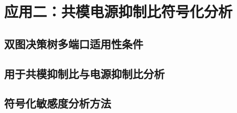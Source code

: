 \chapter{应用二：共模电源抑制比符号化分析}
\label{chap:cmps}

\section{双图决策树多端口适用性条件}
\label{sec:cmps:gpddtheory}

\section{用于共模抑制比与电源抑制比分析}
\label{sec:cmps:analysis}

\section{符号化敏感度分析方法}
\label{sec:cmps:sens}